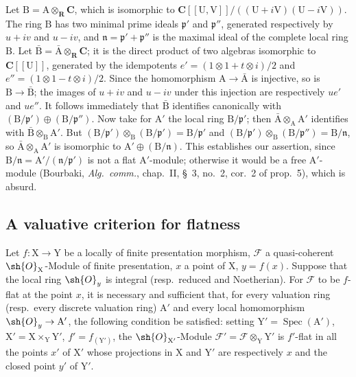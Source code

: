 \begin{env}[11.7.5]
Let $\mathrm{B}=\mathrm{A}\otimes_\mathbf{R}\mathbf{C}$, which is isomorphic to $\mathbf{C}[[\mathrm{U},\mathrm{V}]]/((\mathrm{U}+i\mathrm{V})(\mathrm{U}-i\mathrm{V}))$.
The ring $\mathrm{B}$ has two minimal prime ideals $\mathfrak{p}'$ and $\mathfrak{p}''$, generated respectively by $u+iv$ and $u-iv$, and $\mathfrak{n}=\mathfrak{p}'+\mathfrak{p}''$ is the maximal ideal of the complete local ring $\mathrm{B}$.
Let $\bar{\mathrm{B}}=\bar{\mathrm{A}}\otimes_\mathbf{R}\mathbf{C}$; it is the direct product of two algebras isomorphic to $\mathbf{C}[[\mathrm{U}]]$, generated by the idempotents $e'=(1\otimes 1+t\otimes i)/2$ and $e''=(1\otimes 1-t\otimes i)/2$.
Since the homomorphism $\mathrm{A}\to\bar{\mathrm{A}}$ is injective, so is $\mathrm{B}\to\bar{\mathrm{B}}$; the images of $u+iv$ and $u-iv$ under this injection are respectively $ue'$ and $ue''$.
It follows immediately that $\bar{\mathrm{B}}$ identifies canonically with $(\mathrm{B}/\mathfrak{p}')\oplus(\mathrm{B}/\mathfrak{p}'')$.
Now take for $\mathrm{A}'$ the local ring $\mathrm{B}/\mathfrak{p}'$; then $\bar{\mathrm{A}}\otimes_\mathrm{A}\mathrm{A}'$ identifies with $\bar{\mathrm{B}}\otimes_\mathrm{B}\mathrm{A}'$.
But $(\mathrm{B}/\mathfrak{p}')\otimes_\mathrm{B}(\mathrm{B}/\mathfrak{p}')=\mathrm{B}/\mathfrak{p}'$ and $(\mathrm{B}/\mathfrak{p}')\otimes_\mathrm{B}(\mathrm{B}/\mathfrak{p}'')=\mathrm{B}/\mathfrak{n}$, so $\bar{\mathrm{A}}\otimes_\mathrm{A}\mathrm{A}'$ is isomorphic to $\mathrm{A}'\oplus(\mathrm{B}/\mathfrak{n})$.
This establishes our assertion, since $\mathrm{B}/\mathfrak{n}=\mathrm{A}'/(\mathfrak{n}/\mathfrak{p}')$ is not a flat $\mathrm{A}'$-module; otherwise it would be a free $\mathrm{A}'$-module (Bourbaki, \emph{Alg.\ comm.}, chap.~II, \S~3, no.~2, cor.~2 of prop.~5), which is absurd.
\end{env}

\subsection{A valuative criterion for flatness}
\label{subsection:IV.11.8}

\begin{theorem}[11.8.1]
\label{IV.11.8.1}
Let $f:\mathrm{X}\to\mathrm{Y}$ be a locally of finite presentation morphism, $\mathscr{F}$ a quasi-coherent $\sh{O}_\mathrm{X}$-Module of finite presentation, $x$ a point of $\mathrm{X}$, $y=f(x)$.
Suppose that the local ring $\sh{O}_y$ is integral (resp.\ reduced and Noetherian).
For $\mathscr{F}$ to be $f$-flat at the point $x$, it is necessary and sufficient that, for every valuation ring (resp.\ every discrete valuation ring) $\mathrm{A}'$ and every local homomorphism $\sh{O}_y\to\mathrm{A}'$, the following condition be satisfied: setting $\mathrm{Y}'=\operatorname{Spec}(\mathrm{A}')$, $\mathrm{X}'=\mathrm{X}\times_\mathrm{Y}\mathrm{Y}'$, $f'=f_{(\mathrm{Y}')}$, the $\sh{O}_{\mathrm{X}'}$-Module $\mathscr{F}'=\mathscr{F}\otimes_\mathrm{Y}\mathrm{Y}'$ is $f'$-flat in all the points $x'$ of $\mathrm{X}'$ whose projections in $\mathrm{X}$ and $\mathrm{Y}'$ are respectively $x$ and the closed point $y'$ of $\mathrm{Y}'$.
\end{theorem}

